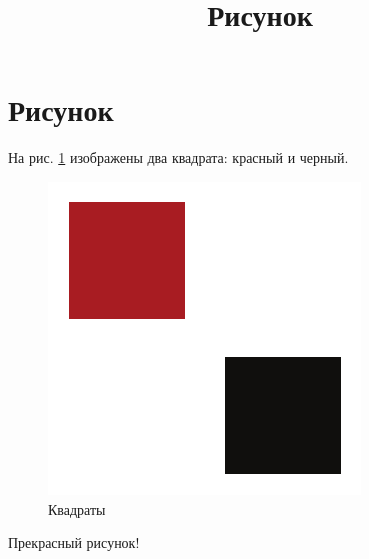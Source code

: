 \documentclass[a4paper,12pt]{article}
\title{Рисунок}
\begin{document}
\section*{Рисунок}

На рис. \ref{squares} изображены два квадрата: красный и черный.

\begin{figure}[bhtp]
\centering
\includegraphics{figure.pdf}
\caption{Квадраты}\label{squares}
\end{figure}

Прекрасный рисунок!
\end{document}
